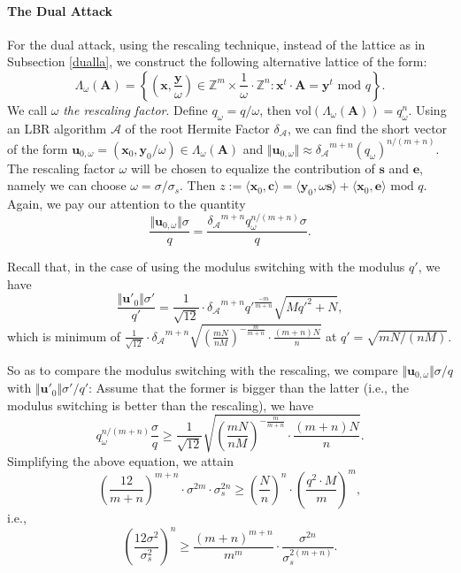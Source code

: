 \documentclass{cta-author}
\begin{document}
\paragraph{The Dual Attack}
For the dual attack, using the rescaling technique, instead of the lattice as in Subsection \ref{dualla}, we construct the following alternative lattice of the form:
\begin{equation*}\label{dualre}
\Lambda_{\omega}{(\mathbf{A})}=\left\{ \left(\mathbf{x}, \frac{\mathbf{y}}{\omega}\right) \in \mathbb{Z}^m \times \frac{1}{\omega}\cdot \mathbb{Z}^n:\mathbf{x}^t\cdot \mathbf{A}=\mathbf{y}^t \text{ mod } q \right\}.
\end{equation*}
We call $\omega$ \textit{the rescaling factor}. Define $q_{\omega}=q/\omega$, then $\text{vol}(\Lambda_{\omega}{(\mathbf{A})})=q_{\omega}^{n}$. Using an LBR algorithm $\mathcal{A}$ of the root Hermite Factor $\delta_{\mathcal{A} }$, we can find the short vector of the form $\mathbf{u}_{0, {\omega}}=(\mathbf{x}_0, \mathbf{y}_0/\omega) \in \Lambda_{\omega}{(\mathbf{A})}$
and $\Vert \mathbf{u}_{0, {\omega}}\Vert\approx {\delta_{\mathcal{A}}}^{m+n}(q_{\omega})^{n/(m+n)}$. The rescaling factor
$\omega$ will be chosen to equalize the contribution of $\mathbf{s}$ and $\mathbf{e}$, namely we can choose $\omega=\sigma/\sigma_s$. Then
$z:=\langle \mathbf{x}_0, \mathbf{c}\rangle=\langle \mathbf{y}_0, \omega \mathbf{s}\rangle+\langle \mathbf{x}_0, \mathbf{e}\rangle \text{ mod } q$. Again, we pay our attention to the quantity
$$\frac{\Vert \mathbf{u}_{0, {\omega}}\Vert \sigma}{q}=\frac{{\delta_{\mathcal{A}}}^{m+n}q_{\omega}^{n/(m+n)}{\sigma}}{q}.$$


Recall that, in the case of using the modulus switching with the modulus $q'$, we have
$$\frac{\Vert \mathbf{u}'_{0}\Vert\sigma'}{q'}=\frac{1}{\sqrt{12}}\cdot {\delta_{\mathcal{A}}}^{m+n}{q'}^{\frac{-m}{m+n}}\sqrt{M{q'}^2+N},$$ 
which is minimum of  $\frac{1}{\sqrt{12}}\cdot {\delta_{\mathcal{A}}}^{m+n}\sqrt{\left(\frac{mN}{nM}\right)^{-\frac{m}{m+n}} \cdot \frac{(m+n)N}{n}}$ at  $q'=\sqrt{mN/(nM)}.$


So as to compare the modulus switching with the rescaling, we compare $\Vert \mathbf{u}_{0, {\omega}}\Vert \sigma/q$ with $\Vert \mathbf{u}'_{0}\Vert\sigma'/q'$: Assume that the former is bigger than the latter (i.e., the modulus switching is better than the rescaling), we have
$$q_{\omega}^{n/(m+n)}\frac{\sigma}{q} \geq \frac{1}{\sqrt{12}}\sqrt{\left(\frac{mN}{nM}\right)^{-\frac{m}{m+n}} \cdot \frac{(m+n)N}{n}}.$$
Simplifying the above equation, we attain
\begin{equation*}\label{eqwmw}
	\left(\frac{12}{m+n}\right)^{m+n} \cdot \sigma^{2m} \cdot \sigma_s^{2n} \geq \left( \frac{N}{n}\right)^{n} \cdot \left(\frac{ q^{2} \cdot M}{m} \right)^m,
	\end{equation*}
	i.e.,
	\begin{equation*}\label{key4}
	\left(\frac{12\sigma^2}{\sigma_s^2}\right)^{n} \geq\frac{(m+n)^{m+n}}{m^{m}}\cdot \frac{\sigma^{2n}}{\sigma_s^{2(m+n)}}.
\end{equation*}
\end{document}

